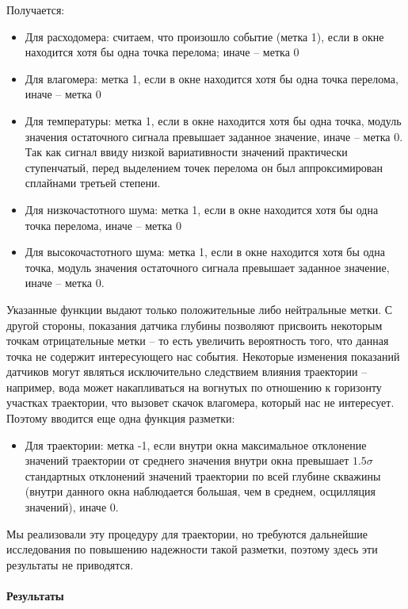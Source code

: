 \par
Получается:
\begin{itemize}
    \item Для расходомера: считаем, что произошло событие (метка 1), если в окне находится хотя бы одна точка перелома; иначе – метка 0
    \item Для влагомера: метка 1, если в окне находится хотя бы одна точка перелома, иначе – метка 0
    \item Для температуры: метка 1, если в окне находится хотя бы одна точка, модуль значения остаточного сигнала превышает заданное значение, иначе – метка 0. Так как сигнал ввиду низкой вариативности значений практически ступенчатый, перед выделением точек перелома он был аппроксимирован сплайнами третьей степени.
    \item Для низкочастотного шума: метка 1, если в окне находится хотя бы одна точка перелома, иначе – метка 0
    \item Для высокочастотного шума: метка 1, если в окне находится хотя бы одна точка, модуль значения остаточного сигнала превышает заданное значение, иначе – метка 0.
\end{itemize}
	
\par
Указанные функции выдают только положительные либо нейтральные метки. С другой стороны, показания датчика глубины позволяют присвоить некоторым точкам отрицательные метки – то есть увеличить вероятность того, что данная точка не содержит интересующего нас события. Некоторые изменения показаний датчиков могут являться исключительно следствием влияния траектории – например, вода может накапливаться на вогнутых по отношению к горизонту участках траектории, что вызовет скачок влагомера, который нас не интересует. Поэтому вводится еще одна функция разметки:
\begin{itemize}
    \item Для траектории: метка -1, если внутри окна максимальное отклонение значений траектории от среднего значения внутри окна превышает $1.5 \sigma$ стандартных отклонений значений траектории по всей глубине скважины (внутри данного окна наблюдается большая, чем в среднем, осцилляция значений), иначе 0.
\end{itemize}
\par
Мы реализовали эту процедуру для траектории, но требуются дальнейшие исследования по повышению надежности такой разметки, поэтому здесь эти результаты не приводятся. 

\paragraph{Результаты}

